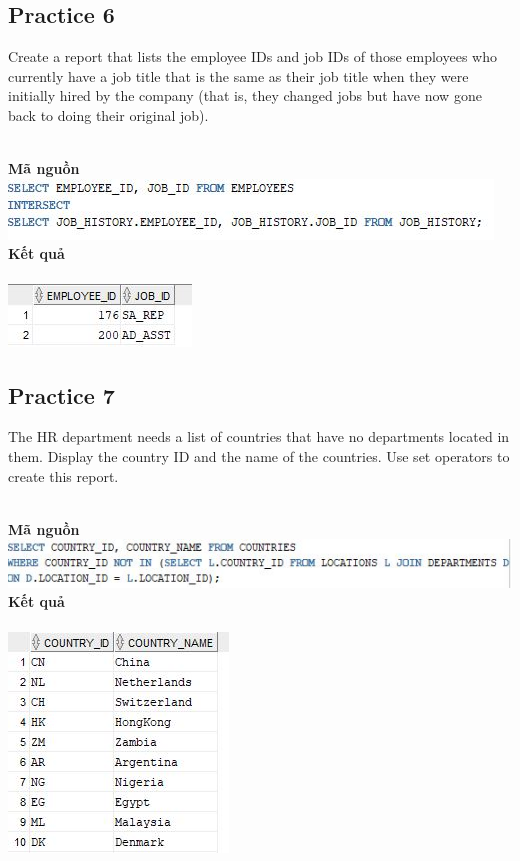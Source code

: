 \documentclass[12pt,a4paper]{report}
\begin{document}
\subsection{Practice 6}
\begin{boxedminipage}[t]{15.5cm}
	Create a report that lists the employee IDs and job IDs of those employees 
	who currently have a job title that is the same as their job title when they were 
	initially hired by the company (that is, they changed jobs but have now gone back 
	to doing their original job).
\end{boxedminipage}
\newline
\\
\textbf{Mã nguồn}
\\
\newline
\includegraphics[scale=1]{66.jpg}\\
\textbf{Kết quả}\\\\
\includegraphics[scale=1]{k66.jpg}

\subsection{Practice 7}
\begin{boxedminipage}[t]{15.5cm}
	The HR department needs a list of countries that have no departments located in them. 
	Display the country ID and the name of the countries. Use set operators to create this report.
\end{boxedminipage}
\newline
\\
\textbf{Mã nguồn}
\\
\newline
\includegraphics[scale=1]{76.jpg}\\
\textbf{Kết quả}\\\\
\includegraphics[scale=1]{k76.jpg}
\end{document}
